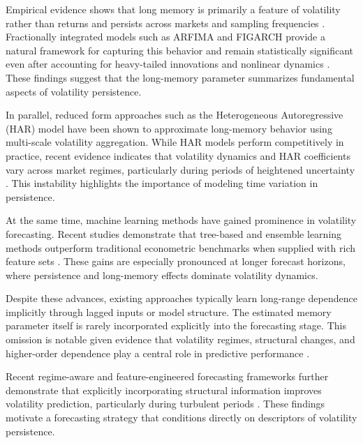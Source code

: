\documentclass[12pt,a4paper]{article}
\begin{document}
\vspace{0.3cm}
\noindent
Empirical evidence shows that long memory is primarily a feature of volatility rather than returns and persists across markets and sampling frequencies
\citep{he2025lrd, baillie2019longmemory}. Fractionally integrated models such as ARFIMA and FIGARCH provide a natural framework for capturing this behavior and remain statistically significant even after accounting for heavy-tailed innovations and nonlinear dynamics \citep{he2025lrd}. These findings suggest that the long-memory parameter summarizes fundamental aspects of volatility persistence.

\vspace{0.3cm}
\noindent
In parallel, reduced form approaches such as the Heterogeneous Autoregressive (HAR) model have been shown to approximate long-memory behavior using multi-scale volatility
aggregation. While HAR models perform competitively in practice, recent evidence indicates that volatility dynamics and HAR coefficients vary across market regimes, particularly during periods of heightened uncertainty \citep{blake2025regime}. This instability highlights the importance of modeling time variation in persistence.

\vspace{0.3cm}
\noindent
At the same time, machine learning methods have gained prominence in volatility forecasting. Recent studies demonstrate that tree-based and ensemble learning methods outperform traditional econometric benchmarks when supplied with rich feature sets
\citep{omer2026mlrv, zhang2024intraday}. These gains are especially pronounced at longer forecast horizons, where persistence and long-memory effects dominate volatility dynamics.

\vspace{0.3cm}
\noindent
Despite these advances, existing approaches typically learn long-range dependence
implicitly through lagged inputs or model structure. The estimated memory parameter itself is rarely incorporated explicitly into the forecasting stage. This omission is notable given evidence that volatility regimes, structural changes, and higher-order dependence play a central role in predictive performance \citep{blake2025regime}.

\vspace{0.3cm}
\noindent
Recent regime-aware and feature-engineered forecasting frameworks further demonstrate that explicitly incorporating structural information improves volatility prediction,
particularly during turbulent periods \citep{blake2025regime}. These findings motivate a forecasting strategy that conditions directly on descriptors of volatility persistence.
\end{document}
